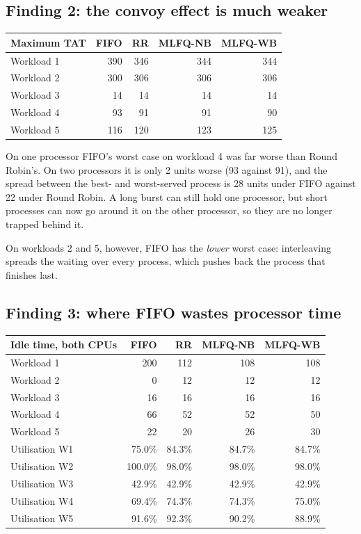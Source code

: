 \documentclass[11pt,a4paper]{article}
\begin{document}
\subsection{Finding 2: the convoy effect is much weaker}

\begin{center}\small
\begin{tabular}{lrrrr}
\toprule
\textbf{Maximum TAT} & \textbf{FIFO} & \textbf{RR} & \textbf{MLFQ-NB} & \textbf{MLFQ-WB}\\
\midrule
Workload 1 & 390 & 346 & 344 & 344 \\
Workload 2 & 300 & 306 & 306 & 306 \\
Workload 3 & 14 & 14 & 14 & 14 \\
Workload 4 & 93 & 91 & 91 & 90 \\
Workload 5 & 116 & 120 & 123 & 125 \\
\bottomrule\end{tabular}\end{center}

On one processor FIFO's worst case on workload 4 was far worse than Round Robin's. On two
processors it is only 2 units worse (93 against 91), and the spread between the best- and
worst-served process is 28 units under FIFO against 22 under Round Robin. A long burst can
still hold one processor, but short processes can now go around it on the other processor,
so they are no longer trapped behind it.

On workloads 2 and 5, however, FIFO has the \emph{lower} worst case: interleaving spreads the
waiting over every process, which pushes back the process that finishes last.

\subsection{Finding 3: where FIFO wastes processor time}

\begin{center}\small
\begin{tabular}{lrrrr}
\toprule
\textbf{Idle time, both CPUs} & \textbf{FIFO} & \textbf{RR} & \textbf{MLFQ-NB} & \textbf{MLFQ-WB}\\
\midrule
Workload 1 & 200 & 112 & 108 & 108 \\
Workload 2 & 0 & 12 & 12 & 12 \\
Workload 3 & 16 & 16 & 16 & 16 \\
Workload 4 & 66 & 52 & 52 & 50 \\
Workload 5 & 22 & 20 & 26 & 30 \\
\midrule
Utilisation W1 & 75.0\% & 84.3\% & 84.7\% & 84.7\% \\
Utilisation W2 & 100.0\% & 98.0\% & 98.0\% & 98.0\% \\
Utilisation W3 & 42.9\% & 42.9\% & 42.9\% & 42.9\% \\
Utilisation W4 & 69.4\% & 74.3\% & 74.3\% & 75.0\% \\
Utilisation W5 & 91.6\% & 92.3\% & 90.2\% & 88.9\% \\
\bottomrule\end{tabular}\end{center}
\end{document}
